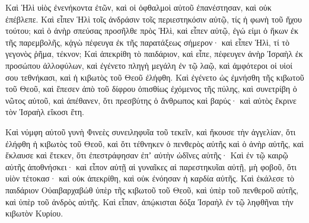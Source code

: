 {Καὶ Ἡλὶ υἱὸς ἐνενήκοντα ἐτῶν, καὶ οἱ ὀφθαλμοὶ αὐτοῦ ἐπανέστησαν, καὶ οὐκ ἐπέβλεπε. Καὶ εἶπεν Ἡλὶ τοῖς ἀνδράσιν τοῖς περιεστηκόσιν αὐτῷ, τίς ἡ φωνὴ τοῦ ἤχου τούτου;
καὶ ὁ ἀνὴρ σπεύσας προσῆλθε πρὸς Ἡλὶ, καὶ εἶπεν αὐτῷ, ἐγώ εἰμι ὁ ἥκων ἐκ τῆς παρεμβολῆς, κᾀγὼ πέφευγα ἐκ τῆς παρατάξεως σήμερον· καὶ εἶπεν Ἡλὶ, τί τὸ γεγονὸς ῥῆμα, τέκνον;
Καὶ ἀπεκρίθη τὸ παιδάριον, καὶ εἶπε, πέφευγεν ἀνὴρ Ἰσραὴλ ἐκ προσώπου ἀλλοφύλων, καὶ ἐγένετο πληγὴ μεγάλη ἐν τῷ λαῷ, καὶ ἀμφότεροι οἱ υἱοί σου τεθνήκασι, καὶ ἡ κιβωτὸς τοῦ Θεοῦ ἐλήφθη.
Καὶ ἐγένετο ὡς ἐμνήσθη τῆς κιβωτοῦ τοῦ Θεοῦ, καὶ ἔπεσεν ἀπὸ τοῦ δίφρου ὀπισθίως ἐχόμενος τῆς πύλης, καὶ συνετρίβη ὁ νῶτος αὐτοῦ, καὶ ἀπέθανεν, ὅτι πρεσβύτης ὁ ἄνθρωπος καὶ βαρύς· καὶ αὐτὸς ἔκρινε τὸν Ἰσραὴλ εἴκοσι ἔτη.
\par }{\PP {}Καὶ νύμφη αὐτοῦ γυνὴ Φινεὲς συνειληφυῖα τοῦ τεκεῖν, καὶ ἤκουσε τὴν ἀγγελίαν, ὅτι ἐλήφθη ἡ κιβωτὸς τοῦ Θεοῦ, καὶ ὅτι τέθνηκεν ὁ πενθερὸς αὐτῆς καὶ ὁ ἀνὴρ αὐτῆς, καὶ ἔκλαυσε καὶ ἔτεκεν, ὅτι ἐπεστράφησαν ἐπʼ αὐτὴν ὠδῖνες αὐτῆς·
Καὶ ἐν τῷ καιρῷ αὐτῆς ἀποθνήσκει· καὶ εἶπον αὐτῇ αἱ γυναῖκες αἱ παρεστηκυῖαι αὐτῇ, μὴ φοβοῦ, ὅτι υἱὸν τέτοκασ· καὶ οὐκ ἀπεκρίθη, καὶ οὐκ ἐνόησαν ἡ καρδία αὐτῆς.
Καὶ ἐκάλεσε τὸ παιδάριον Οὐαιβαρχαβώθ ὑπὲρ τῆς κιβωτοῦ τοῦ Θεοῦ, καὶ ὑπὲρ τοῦ πενθεροῦ αὐτῆς, καὶ ὑπὲρ τοῦ ἀνδρὸς αὐτῆς.
Καὶ εἶπαν, ἀπῴκισται δόξα Ἰσραὴλ ἐν τῷ ληφθῆναι τὴν κιβωτὸν Κυρίου.

}
